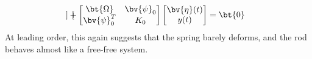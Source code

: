 \begin{enumerate}[(i)]
{\begin{enumerate}[(a)]
{\begin{equation}
\begin{bmatrix}
            \end{bmatrix} + 
            \begin{bmatrix}
                \bt{\Omega} & \bv{\psi}_0 \\
                \bv{\psi}_0^T & K_0 
            \end{bmatrix}
            \begin{bmatrix}
                \bv{\eta}(t) \\ y(t)
            \end{bmatrix} = \bt{0}
        \end{equation}
        At leading order, this again suggests that the spring barely deforms, and the rod behaves almost like a free-free system. 
    }
    \end{enumerate}
}
\end{enumerate}
